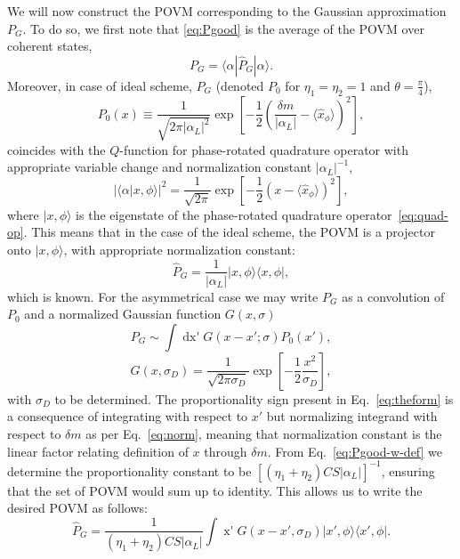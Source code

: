 We will now construct the POVM corresponding to the Gaussian approximation $P_G$. To do so, we first note that \eqref{eq:Pgood} is the average of the POVM over coherent states,
\begin{equation}
    P_G=\langle\alpha|\hat{P}_G|\alpha\rangle.
\end{equation}
Moreover, in case of ideal scheme, $P_G$ (denoted $P_0$ for $\eta_1=\eta_2=1$ and $\theta=\frac\pi4$),
\begin{equation}
    \label{eq:p-0}
    P_0\left(x\right)\equiv
    \frac{1}{\sqrt{2\pi|\alpha_L|^2}}
    \exp \left[-\frac{1}{2}{\left(\frac{\delta m}{|\alpha_L|}-\langle\hat{x}_\phi\rangle\right)^2}\right],
\end{equation}
coincides with the $Q$-function for phase-rotated quadrature operator with appropriate variable change and normalization constant $|\alpha_L|^{-1}$,
\begin{equation}
    |\langle \alpha|x , \phi \rangle |^2 = \frac{1}{\sqrt{2\pi}}\exp\left[-\frac{1}{2}\left(x  - \langle \hat{x}_\phi\rangle\right)^2\right], 
\end{equation}
where $|x,\phi\rangle$ is the eigenstate of the phase-rotated quadrature operator~\eqref{eq:quad-op}. This means that in the case of the ideal scheme, the POVM is a projector onto $|x,\phi\rangle$, with appropriate normalization constant:
\begin{equation}
    \hat{P}_G=\frac{1}{|\alpha_L|}|x,\phi\rangle\langle x,\phi|,
\end{equation}
which is known. For the asymmetrical case we may write $P_G$ as a convolution of $P_0$ and a normalized Gaussian function $G(x,\sigma)$
\begin{equation}
    P_G\sim\int\mathop{dx'}G(x-x';\sigma)P_0(x'), \label{eq:theform}
\end{equation}
\begin{equation}
G(x, \sigma_D) = \frac{1}{\sqrt{2\pi\sigma_D}}\exp\left[-\frac{1}{2}\frac{x^2}{\sigma_D}\right],
\end{equation}
with $\sigma_D$ to be determined. The proportionality sign present in Eq.~\eqref{eq:theform} is a consequence of integrating with respect to $x'$ but normalizing integrand with respect to $\delta m$ as per Eq.~\eqref{eq:norm}, meaning that normalization constant is the linear factor relating definition of $x$ through $\delta m$. From Eq.~\eqref{eq:Pgood-w-def} we determine the proportionality constant to be $\left[\left(\eta_1+\eta_2\right)CS|\alpha_L|\right]^{-1}$, ensuring that the set of POVM would sum up to identity. This allows us to write the desired POVM as follows:
\begin{equation}
\hat{P}_G= \frac{1}{\left(\eta_1+\eta_2\right)CS|\alpha_L|}\int\mathop{d^2x'}G(x-x',\sigma_D)|x',\phi\rangle\langle x',\phi|.
\label{eq:method-1}
\end{equation}

